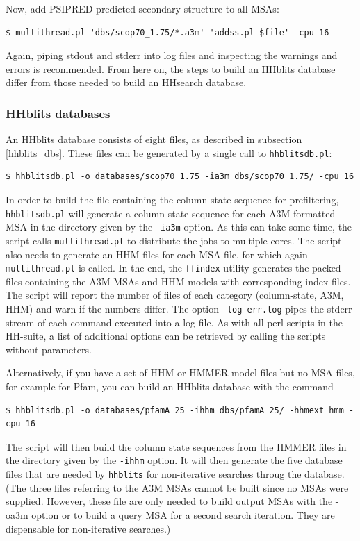 \documentclass[11pt,a4paper]{article}
\begin{document}
Now, add PSIPRED-predicted secondary structure to all MSAs:
\begin{verbatim}
$ multithread.pl 'dbs/scop70_1.75/*.a3m' 'addss.pl $file' -cpu 16 
\end{verbatim}
Again, piping stdout and stderr into log files and inspecting the warnings and errors is recommended. From here on, the steps to build an HHblits database differ from those needed to build an HHsearch database.

\subsubsection*{HHblits databases}

An HHblits database consists of eight files, as described in subsection \ref{hhblits_dbs}. These files can be generated by a single call to \verb`hhblitsdb.pl`:
\begin{verbatim}
$ hhblitsdb.pl -o databases/scop70_1.75 -ia3m dbs/scop70_1.75/ -cpu 16
\end{verbatim}
In order to build the file containing the column state sequence for prefiltering, \verb`hhblitsdb.pl` will generate a column state sequence for each A3M-formatted MSA in the directory given by the \verb`-ia3m` option. As this can take some time, the script calls \verb`multithread.pl` to distribute the jobs to multiple cores. The script also needs to generate an HHM files for each MSA file, for which again \verb`multithread.pl` is called. In the end, the \verb`ffindex` utility generates the packed files containing the A3M MSAs and HHM models with corresponding index files. The script will report the number of files of each category (column-state, A3M, HHM) and warn if the numbers differ. The option \verb`-log err.log` pipes the stderr stream of each command executed into a log file. As with all perl scripts in the HH-suite, a list of additional options can be retrieved by calling the scripts without parameters.

Alternatively, if you have a set of HHM or HMMER model files but no MSA files, for example for Pfam, you can build an HHblits database with the command
\begin{verbatim}
$ hhblitsdb.pl -o databases/pfamA_25 -ihhm dbs/pfamA_25/ -hhmext hmm -cpu 16
\end{verbatim}
The script will then build the column state sequences from the HMMER files in the directory given by the \verb`-ihhm` option. It will then generate the five database files that are needed by \verb`hhblits` for non-iterative searches throug the database. (The three files referring to the A3M MSAs cannot be built since no MSAs were supplied. However, these file are only needed to build output MSAs with the -oa3m option or to build a query MSA for a second search iteration. They are dispensable for non-iterative searches.)
\end{document}
